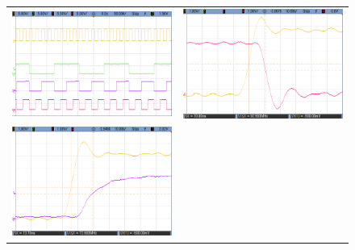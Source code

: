 \begin{figure}[H]
    \centering
        \begin{tabular}{c c}
            \includegraphics[scale=0.2]{../EJ7/Mediciones/Osciloscopio/Sincronico/cropped_contador.png} &
            \includegraphics[scale=0.2]{../EJ7/Mediciones/Osciloscopio/Sincronico/cropped_salida_q0.png} \\
            \includegraphics[scale=0.2]{../EJ7/Mediciones/Osciloscopio/Sincronico/cropped_salida_q1.png} &

\end{tabular}
\end{figure}
